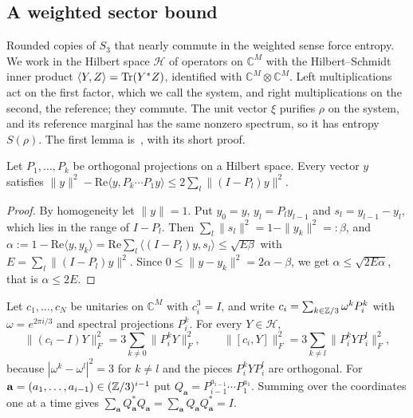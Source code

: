 \subsection{A weighted sector bound}

Rounded copies of $S_3$ that nearly commute in the weighted sense force entropy. We work in the Hilbert space $\mathcal H$ of operators on
$\mathbb C^M$ with the Hilbert--Schmidt inner product $\langle Y,Z\rangle=\operatorname{Tr}(Y^*Z)$, identified with $\mathbb C^M\otimes\mathbb C^M$. Left multiplications
act on the first factor, which we call the system, and right multiplications on the second, the reference; they commute. The unit vector $\xi$
purifies $\rho$ on the system, and its reference marginal has the same nonzero spectrum, so it has entropy $S(\rho)$. The first lemma
is~\cite[Lemma~4.1]{DouglasMghirbiA}, with its short proof.

\begin{lemma}\label{lem:projection-product}
Let $P_1,\dots,P_k$ be orthogonal projections on a Hilbert space. Every vector $y$ satisfies
$\|y\|^2-\mathrm{Re}\langle y,P_k\cdots P_1y\rangle\le2\sum_l\|(I-P_l)y\|^2$.
\end{lemma}

\begin{proof}
By homogeneity let $\|y\|=1$. Put $y_0=y$, $y_l=P_ly_{l-1}$ and $s_l=y_{l-1}-y_l$, which lies in the range of $I-P_l$. Then
$\sum_l\|s_l\|^2=1-\|y_k\|^2=:\beta$, and $\alpha:=1-\mathrm{Re}\langle y,y_k\rangle=\mathrm{Re}\sum_l\langle(I-P_l)y,s_l\rangle\le\sqrt{E\beta}$ with
$E=\sum_l\|(I-P_l)y\|^2$. Since $0\le\|y-y_k\|^2=2\alpha-\beta$, we get $\alpha\le\sqrt{2E\alpha}$, that is $\alpha\le2E$.
\end{proof}

Let $c_1,\dots,c_N$ be unitaries on $\mathbb C^M$ with $c_i^3=I$, and write $c_i=\sum_{k\in\mathbb Z/3}\omega^kP_i^k$ with $\omega=e^{2\pi i/3}$ and spectral
projections $P_i^k$. For every $Y\in\mathcal H$,
\begin{equation}\label{eq:spectral-identities}
\|(c_i-I)Y\|_F^2=3\sum_{k\ne0}\|P_i^kY\|_F^2,\qquad\|[c_i,Y]\|_F^2=3\sum_{k\ne l}\|P_i^kYP_i^l\|_F^2,
\end{equation}
because $|\omega^k-\omega^l|^2=3$ for $k\ne l$ and the pieces $P_i^kYP_i^l$ are orthogonal. For $\mathbf a=(a_1,\dots,a_{i-1})\in(\mathbb Z/3)^{i-1}$ put
$Q_{\mathbf a}=P_{i-1}^{a_{i-1}}\cdots P_1^{a_1}$. Summing over the coordinates one at a time gives
$\sum_{\mathbf a}Q_{\mathbf a}^*Q_{\mathbf a}=\sum_{\mathbf a}Q_{\mathbf a}Q_{\mathbf a}^*=I$.

